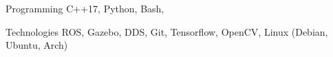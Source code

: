 
\begin{cvskills}

  \cvskill
    {Programming} %
    {C++17, Python, Bash, } %

  \cvskill
    {Technologies} %
    {ROS, Gazebo, DDS, Git, Tensorflow, OpenCV, Linux (Debian, Ubuntu, Arch)} %


\end{cvskills}
